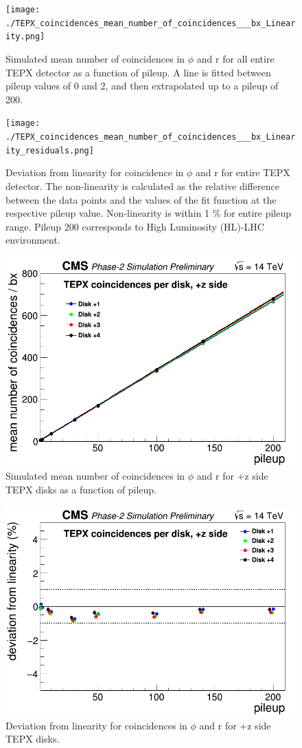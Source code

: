 \begin{figure}[H]
  \centering
  \texttt{[image: ./TEPX\_coincidences\_mean\_number\_of\_coincidences\_\_\_bx\_Linearity.png]}
  \caption{Simulated mean number of coincidences in $\phi$ and r for all entire TEPX detector as a function of pileup. A line is fitted between pileup values of 0 and 2, and then extrapolated up to a pileup of 200.}
  \label{fig:CMS}
\end{figure}


\begin{figure}[H]
  \centering
  \texttt{[image: ./TEPX\_coincidences\_mean\_number\_of\_coincidences\_\_\_bx\_Linearity\_residuals.png]}
  \caption{Deviation from linearity for coincidence in $\phi$ and r for entire TEPX detector. The non-linearity is calculated as
the relative difference between the data points and the values of the fit function at the respective pileup value.
Non-linearity is within 1 \% for entire pileup range. Pileup 200 corresponds to High Luminosity (HL)-LHC
environment.}
  \label{fig:CMS}
\end{figure}

\begin{figure}[H]
  \centering
  \includegraphics[width=0.5\columnwidth]{./TEPX_coincidences_per_disk__pz_side_mean_number_of_coincidences___bx_Linearity.png}
  \caption{Simulated mean number of coincidences in $\phi$ and r for +z side TEPX disks as a function of pileup.}
  \label{fig:CMS}
\end{figure}


\begin{figure}[H]
  \centering
  \includegraphics[width=0.5\columnwidth]{./TEPX_coincidences_per_disk__pz_side_mean_number_of_coincidences___bx_Linearity_residuals.png}
  \caption{Deviation from linearity for coincidences in $\phi$ and r for +z side TEPX disks.}
  \label{fig:CMS}
\end{figure}


